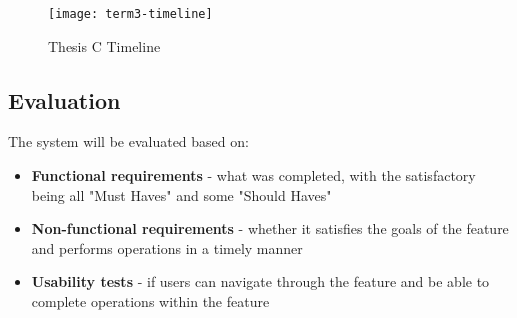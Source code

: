 \begin{figure}[h!]
\centering
\texttt{[image: term3-timeline]}
\caption{Thesis C Timeline}
\end{figure}


\subsection{Evaluation}
The system will be evaluated based on:
\begin{itemize}
	\item \textbf{Functional requirements} - what was completed, with the satisfactory being all "Must Haves" and some "Should Haves"
	\item \textbf{Non-functional requirements} - whether it satisfies the goals of the feature and performs operations in a timely manner
	\item \textbf{Usability tests} - if users can navigate through the feature and be able to complete operations within the feature
\end{itemize}